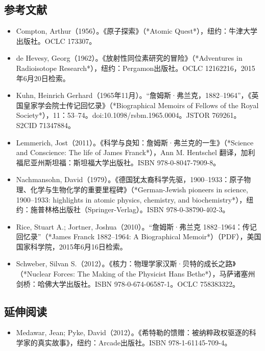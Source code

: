 \subsection{参考文献}
\begin{itemize}
\item Compton, Arthur（1956）。《原子探索》（*Atomic Quest*），纽约：牛津大学出版社。OCLC 173307。
\item de Hevesy, Georg（1962）。《放射性同位素研究的冒险》（*Adventures in Radioisotope Research*），纽约：Pergamon出版社。OCLC 12162216，2015年6月20日检索。
\item Kuhn, Heinrich Gerhard（1965年11月）。“詹姆斯·弗兰克，1882–1964”，《英国皇家学会院士传记回忆录》（*Biographical Memoirs of Fellows of the Royal Society*），11：53–74。doi:10.1098/rsbm.1965.0004。JSTOR 769261。S2CID 71347884。
\item Lemmerich, Jost（2011）。《科学与良知：詹姆斯·弗兰克的一生》（*Science and Conscience: The life of James Franck*），Ann M. Hentschel 翻译，加利福尼亚州斯坦福：斯坦福大学出版社。ISBN 978-0-8047-7909-8。
\item Nachmansohn, David（1979）。《德国犹太裔科学先驱，1900–1933：原子物理、化学与生物化学的重要里程碑》（*German-Jewish pioneers in science, 1900–1933: highlights in atomic physics, chemistry, and biochemistry*），纽约：施普林格出版社（Springer-Verlag）。ISBN 978-0-38790-402-3。
\item Rice, Stuart A.; Jortner, Joshua（2010）。“詹姆斯·弗兰克 1882–1964：传记回忆录”（*James Franck 1882–1964: A Biographical Memoir*）（PDF），美国国家科学院，2015年6月16日检索。
\item Schweber, Silvan S.（2012）。《核力：物理学家汉斯·贝特的成长之路》（*Nuclear Forces: The Making of the Physicist Hans Bethe*），马萨诸塞州剑桥：哈佛大学出版社。ISBN 978-0-674-06587-1。OCLC 758383322。
\end{itemize}
\subsection{延伸阅读}
\begin{itemize}
\item Medawar, Jean; Pyke, David（2012）。《希特勒的馈赠：被纳粹政权驱逐的科学家的真实故事》，纽约：Arcade出版社。ISBN 978-1-61145-709-4。
\end{itemize}
